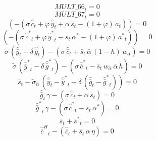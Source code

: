 \begin{dmath}
{MULT\_66}_{t}=0
\end{dmath}
\begin{dmath}
{MULT\_67}_{t}=0
\end{dmath}
\begin{dmath}
\left(-\left({{\sigma}}\, {{\hat {\bar c}}}_{t}+{{\varphi}}\, {{\hat {\bar y}}}_{t}+{{\alpha}}\, {{\bar s}}_{t}-\left(1+{{\varphi}}\right)\, {{a}}_{t}\right)\right)=0
\end{dmath}
\begin{dmath}
\left(-\left({{\sigma}}\, {{\hat {\bar c}^*}}_{t}+{{\varphi}}\, {{\hat {\bar y}^*}}_{t}-{{\bar s}}_{t}\, {{\alpha^*}}-\left(1+{{\varphi}}\right)\, {{a^*}}_{t}\right)\right)=0
\end{dmath}
\begin{dmath}
{{\tilde{\sigma}}}\, \left({{\hat {\bar y}}}_{t}-{{\delta}}\, {{\hat {\bar g}}}_{t}\right)-\left({{\sigma}}\, {{\hat {\bar c}}}_{t}+{{\bar s}}_{t}\, {{\bar{\alpha}}}\, \left(1-{{h}}\right)\, {{w_{\bar{\alpha}}}}\right)=0
\end{dmath}
\begin{dmath}
{{\tilde{\sigma}}}\, \left({{\hat {\bar y}^*}}_{t}-{{\delta}}\, {{\hat {\bar g}^*}}_{t}\right)-\left({{\sigma}}\, {{\hat {\bar c}^*}}_{t}-{{\bar s}}_{t}\, {{w_{\bar{\alpha}}}}\, {{\bar{\alpha}}}\, {{h}}\right)=0
\end{dmath}
\begin{dmath}
{{\bar s}}_{t}-{{\tilde\sigma_{\bar{\alpha}}}}\, \left({{\hat {\bar y}}}_{t}-{{\hat {\bar y}^*}}_{t}-{{\delta}}\, \left({{\hat {\bar g}}}_{t}-{{\hat {\bar g}^*}}_{t}\right)\right)=0
\end{dmath}
\begin{dmath}
{{\hat {\bar g}}}_{t}\, {{\gamma}}-\left({{\sigma}}\, {{\hat {\bar c}}}_{t}+{{\alpha}}\, {{\bar s}}_{t}\right)=0
\end{dmath}
\begin{dmath}
{{\hat {\bar g}^*}}_{t}\, {{\gamma}}-\left({{\sigma}}\, {{\hat {\bar c}^*}}_{t}-{{\bar s}}_{t}\, {{\alpha^*}}\right)=0
\end{dmath}
\begin{dmath}
{{\bar s}}_{t}+{{\bar s^*}}_{t}=0
\end{dmath}
\begin{dmath}
{{\hat {\bar c}^H}}_{t}-\left({{\hat {\bar c}}}_{t}+{{\bar s}}_{t}\, {{\alpha}}\, {{\eta}}\right)=0
\end{dmath}
